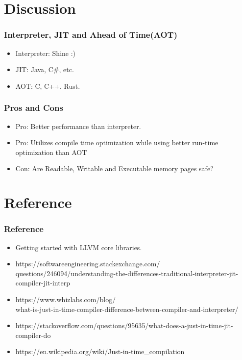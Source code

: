\documentclass{beamer}
\begin{document}
\section{Discussion}

\begin{frame}
\frametitle{Interpreter, JIT and Ahead of Time(AOT)}
\begin{itemize}
	\item Interpreter: Shine :)
	\item JIT: Java, C\#, etc.
	\item AOT: C, C++, Rust.
\end{itemize}
\end{frame}

\begin{frame}
\frametitle{Pros and Cons}
\begin{itemize}
	\item Pro: Better performance than interpreter.
	\item Pro: Utilizes compile time optimization while using better run-time optimization than AOT
	\item Con: Are Readable, Writable and Executable memory pages safe?
\end{itemize}
\end{frame}

\section{Reference}
\begin{frame}
\frametitle{Reference}
\begin{itemize}
	\item Getting started with LLVM core libraries.
	\item https://softwareengineering.stackexchange.com/\\questions/246094/understanding-the-differences-traditional-interpreter-jit-compiler-jit-interp
	\item https://www.whizlabs.com/blog/\\what-is-just-in-time-compiler-difference-between-compiler-and-interpreter/
	\item https://stackoverflow.com/questions/95635/what-does-a-just-in-time-jit-compiler-do
	\item https://en.wikipedia.org/wiki/Just-in-time\_compilation
\end{itemize}
\end{frame}
\end{document}
